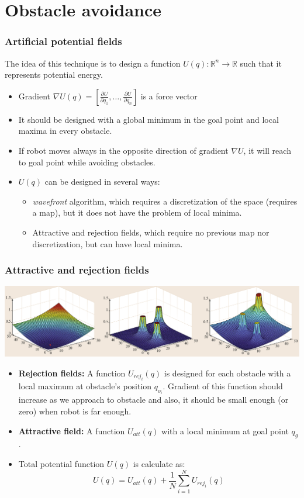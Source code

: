 \section{Obstacle avoidance}
\begin{frame}\frametitle{Artificial potential fields}
  The idea of this technique is to design a function $U(q):\mathbb{R}^n\rightarrow \mathbb{R}$ such that it represents potential energy.
  \begin{itemize}
  \item Gradient $\nabla U(q) = \left[\frac{\partial U}{\partial q_1},\dots,\frac{\partial U}{\partial q_n}\right]$ is a force vector
  \item It should be designed with a global minimum in the goal point and local maxima in every obstacle.
  \item If robot moves always in the opposite direction of gradient $\nabla U$, it will reach to goal point while avoiding obstacles. 
  \item $U(q)$ can be designed in several ways:
    \begin{itemize}
    \item \textit{wavefront} algorithm, which requires a discretization of the space (requires a map), but it does not have the problem of local minima.
    \item Attractive and rejection fields, which require no previous map nor discretization, but can have local minima. 
    \end{itemize}
  \end{itemize}
\end{frame}

\begin{frame}\frametitle{Attractive and rejection fields}
  \includegraphics[width=\textwidth]{Figures/MotionPlanning/PotFieldsExample.png}
  \begin{itemize}
  \item \textbf{Rejection fields:} A function $U_{rej_i}(q)$ is designed for each obstacle with a local maximum at obstacle's position $q_{o_i}$. Gradient of this function should increase as we approach to obstacle and also, it should be small enough (or zero) when robot is far enough.
  \item \textbf{Attractive field:} A function $U_{att}(q)$ with a local minimum at goal point $q_g$.
  \item Total potential function  $U(q)$ is calculate as:
    \[ U(q) = U_{att}(q) + \frac{1}{N}\sum_{i=1}^N U_{rej_i}(q)\]
  \end{itemize}
\end{frame}

